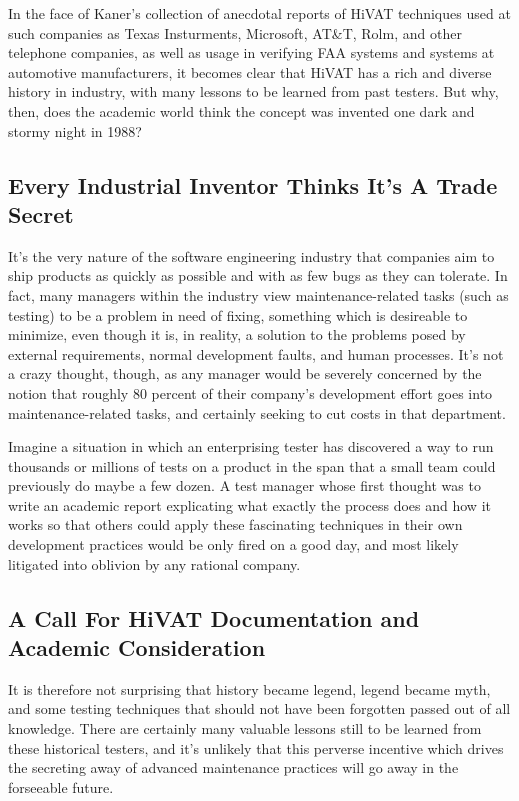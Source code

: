 In the face of Kaner's collection of anecdotal reports of HiVAT techniques used at such companies as Texas Insturments, Microsoft, AT\&T, Rolm, and other telephone companies, as well as usage in verifying FAA systems and systems at automotive manufacturers, it becomes clear that HiVAT has a rich and diverse history in industry, with many lessons to be learned from past testers. But why, then, does the academic world think the concept was invented one dark and stormy night in 1988?

\subsection{Every Industrial Inventor Thinks It's A Trade Secret}
It's the very nature of the software engineering industry that companies aim to ship products as quickly as possible and with as few bugs as they can tolerate. In fact, many managers within the industry view maintenance-related tasks (such as testing) to be a problem in need of fixing, something which is desireable to minimize, even though it is, in reality, a solution to the problems posed by external requirements, normal development faults, and human processes.\citep{glass2002Facts} It's not a crazy thought, though, as any manager would be severely concerned by the notion that roughly 80 percent of their company's development effort goes into maintenance-related tasks, and certainly seeking to cut costs in that department.\citep{pigoski1996practical}

Imagine a situation in which an enterprising tester has discovered a way to run thousands or millions of tests on a product in the span that a small team could previously do maybe a few dozen. A test manager whose first thought was to write an academic report explicating what exactly the process does and how it works so that others could apply these fascinating techniques in their own development practices would be only fired on a good day, and most likely litigated into oblivion by any rational company.

\subsection{A Call For HiVAT Documentation and Academic Consideration}
It is therefore not surprising that history became legend, legend became myth, and some testing techniques that should not have been forgotten passed out of all knowledge. There are certainly many valuable lessons still to be learned from these historical testers, and it's unlikely that this perverse incentive which drives the secreting away of advanced maintenance practices will go away in the forseeable future.

